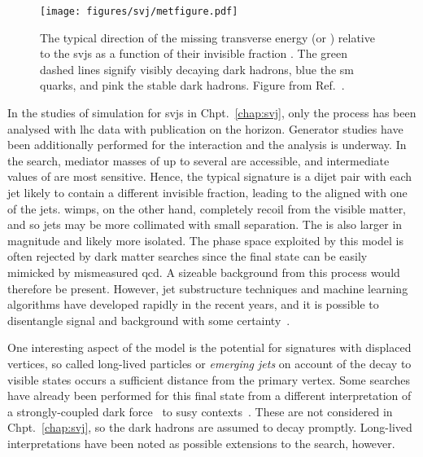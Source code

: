 \begin{figure}[htbp]
    \centering
    \texttt{[image: figures/svj/metfigure.pdf]}
    \caption[The typical direction of the missing transverse energy relative to the semi-visible jets as a function of the invisible fraction \rinv]{The typical direction of the missing transverse energy \ETslash\xspace (or \ptvecmiss) relative to the \glspl{svj} as a function of their invisible fraction \rinv. The green dashed lines signify visibly decaying dark hadrons, blue the \acrshort{sm} quarks, and pink the stable dark hadrons. Figure from Ref.~.}
    \label{fig:theory_svj_met_dir}
\end{figure}

In the studies of simulation for \glspl{svj} in Chpt.~\ref{chap:svj}, only the \schannel process has been analysed with \acrshort{lhc} data with publication on the horizon. Generator studies have been additionally performed for the \tchannel interaction and the analysis is underway. In the \schannel search, mediator masses of up to several \TeVns are accessible, and intermediate values of \rinv are most sensitive. Hence, the typical signature is a dijet pair with each \gls{jet} likely to contain a different invisible fraction, leading to the \ptvecmiss aligned with one of the \glspl{jet}. \glspl{wimp}, on the other hand, completely recoil from the visible matter, and so \glspl{jet} may be more collimated with small separation. The \ptvecmiss is also larger in magnitude and likely more isolated. The phase space exploited by this model is often rejected by dark matter searches since the final state can be easily mimicked by mismeasured \acrshort{qcd}. A sizeable background from this process would therefore be present. However, \gls{jet} substructure techniques and machine learning algorithms have developed rapidly in the recent years, and it is possible to disentangle signal and background with some certainty~\cite{GiorgiaRaucoThesis}.

One interesting aspect of the model is the potential for signatures with displaced vertices, so called long-lived particles or \emph{emerging jets} on account of the decay to visible states occurs a sufficient distance from the primary vertex. Some searches have already been performed for this final state from a different interpretation of a strongly-coupled dark force~\cite{Sirunyan:2018njd} to \acrlong{susy} contexts~\cite{SUS16038published}. These are not considered in Chpt.~\ref{chap:svj}, so the dark hadrons are assumed to decay promptly. Long-lived interpretations have been noted as possible extensions to the search, however.
